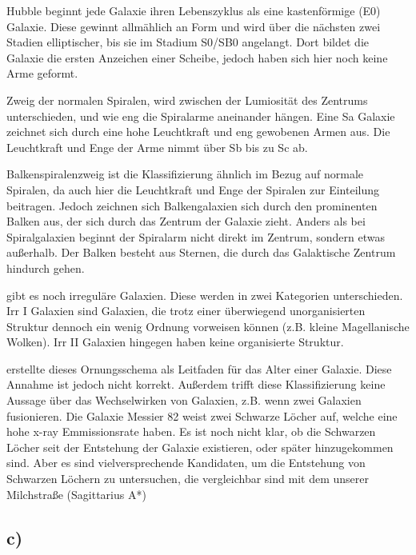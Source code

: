     \justifying Hubble beginnt jede Galaxie ihren Lebenszyklus als eine kastenförmige (E0) Galaxie. Diese gewinnt allmählich 
    an Form und wird über die nächsten zwei Stadien elliptischer, bis sie im Stadium S0/SB0 angelangt. Dort bildet die Galaxie die ersten 
    Anzeichen einer Scheibe, jedoch haben sich hier noch keine Arme geformt. 

    \justifying Zweig der normalen Spiralen, wird zwischen der Lumiosität des Zentrums unterschieden, und wie eng die Spiralarme
    aneinander hängen. Eine Sa Galaxie zeichnet sich durch eine hohe Leuchtkraft und eng gewobenen Armen aus. Die Leuchtkraft und Enge der Arme 
    nimmt über Sb bis zu Sc ab. 

    \justifying Balkenspiralenzweig ist die Klassifizierung ähnlich im Bezug auf normale Spiralen, da auch hier die Leuchtkraft
    und Enge der Spiralen zur Einteilung beitragen. Jedoch zeichnen sich Balkengalaxien sich durch den prominenten Balken aus, der sich durch das
    Zentrum der Galaxie zieht. Anders als bei Spiralgalaxien beginnt der Spiralarm nicht direkt im Zentrum, sondern etwas außerhalb. Der Balken
    besteht aus Sternen, die durch das Galaktische Zentrum hindurch gehen.

    \justifying gibt es noch irreguläre Galaxien. Diese werden in zwei Kategorien unterschieden. Irr I Galaxien sind 
    Galaxien, die trotz einer überwiegend unorganisierten Struktur dennoch ein wenig Ordnung vorweisen können (z.B. kleine Magellanische Wolken).
    Irr II Galaxien hingegen haben keine organisierte Struktur. 

    \justifying erstellte dieses Ornungsschema als Leitfaden für das Alter einer Galaxie. Diese Annahme ist jedoch nicht korrekt.
    Außerdem trifft diese Klassifizierung keine Aussage über das Wechselwirken von Galaxien, z.B. wenn zwei Galaxien fusionieren. Die Galaxie Messier 82
    weist zwei Schwarze Löcher auf, welche eine hohe x-ray Emmissionsrate haben. Es ist noch nicht klar, ob die Schwarzen Löcher seit der Entstehung 
    der Galaxie existieren, oder später hinzugekommen sind. Aber es sind vielversprechende Kandidaten, um die Entstehung von Schwarzen Löchern zu
    untersuchen, die vergleichbar sind mit dem unserer Milchstraße (Sagittarius A*)



\subsection{c)}

